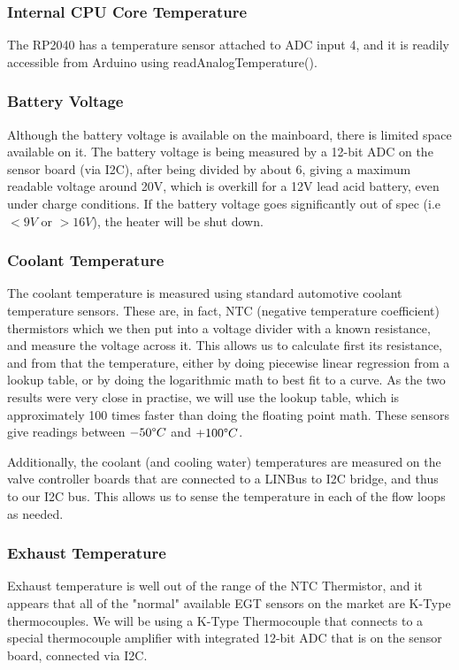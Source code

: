 \documentclass[lettersize,journal]{IEEEtran}
\begin{document}
\subsubsection{Internal CPU Core Temperature}
The RP2040 has a temperature sensor attached to ADC input 4, and it is readily accessible from Arduino using readAnalogTemperature().

\subsubsection{Battery Voltage}
Although the battery voltage is available on the mainboard, there is limited space available on it.  The battery voltage is being measured by a 12-bit ADC on the sensor board (via I2C), after being divided by about 6, giving a maximum readable voltage around 20V, which is overkill for a 12V lead acid battery, even under charge conditions.  If the battery voltage goes significantly out of spec (i.e $< 9V$ or $> 16V$), the heater will be shut down.

\subsubsection{Coolant Temperature}
The coolant temperature is measured using standard automotive coolant temperature sensors.  These are, in fact, NTC (negative temperature coefficient) thermistors which we then put into a voltage divider with a known resistance, and measure the voltage across it.  This allows us to calculate first its resistance, and from that the temperature, either by doing piecewise linear regression from a lookup table, or by doing the logarithmic math to best fit to a curve.  As the two results were very close in practise, we will use the lookup table, which is approximately 100 times faster than doing the floating point math.  These sensors give readings between $-50 \degree C$ and $+100 \degree C$.

Additionally, the coolant (and cooling water) temperatures are measured on the valve controller boards that are connected to a LINBus to I2C bridge, and thus to our I2C bus.  This allows us to sense the temperature in each of the flow loops as needed.

\subsubsection{Exhaust Temperature}
Exhaust temperature is well out of the range of the NTC Thermistor, and it appears that all of the "normal" available EGT sensors on the market are K-Type thermocouples.  We will be using a K-Type Thermocouple that connects to a special thermocouple amplifier with integrated 12-bit ADC that is on the sensor board, connected via I2C.
\end{document}
